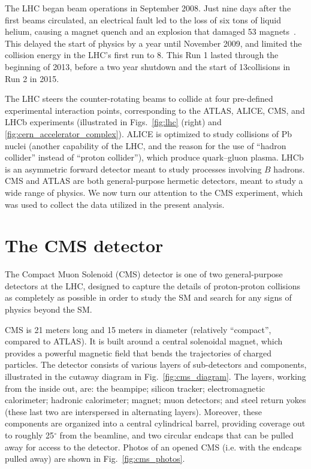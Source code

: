 The LHC began beam operations in September 2008. Just nine days after the
first beams circulated, an electrical fault led to the loss of
six tons of liquid helium, causing a magnet quench and an explosion
that damaged 53 magnets~\cite{LHC_incident}. This delayed the start of physics by a year until
November 2009, and limited the collision energy in the LHC's first run to 8\TeV.
This Run 1 lasted through the beginning of 2013, before a two year shutdown
and the start of 13\TeV collisions in Run 2 in 2015.

The LHC steers the counter-rotating beams to collide at four pre-defined
experimental interaction points, corresponding to the ATLAS, ALICE,
CMS, and LHCb experiments (illustrated in Figs.~\ref{fig:lhc} (right)
and \ref{fig:cern_accelerator_complex}).
ALICE is optimized to study collisions of Pb nuclei
(another capability of the LHC, and the reason for the use of 
``hadron collider'' instead of ``proton collider''), which
produce quark--gluon plasma. LHCb is an asymmetric forward
detector meant to study processes involving $B$ hadrons.
CMS and ATLAS are both general-purpose hermetic detectors,
meant to study a wide range of physics. 
We now turn our attention to the CMS experiment, which was used
to collect the data utilized in the present analysis.


\section{The CMS detector}
\label{sec:cms_det}

The Compact Muon Solenoid (CMS) detector is one of two general-purpose detectors
at the LHC, designed to capture the details of proton-proton collisions
as completely as possible in order to study the SM and search for any signs
of physics beyond the SM.

CMS is 21 meters long and 15 meters in diameter (relatively ``compact'', compared
to ATLAS). It is built around a central solenoidal magnet, which
provides a powerful magnetic field that bends the trajectories of charged
particles. The detector consists of various layers of sub-detectors and components,
illustrated in the cutaway diagram in Fig.~\ref{fig:cms_diagram}. The layers,
working from the inside out, are: the beampipe; silicon tracker;
electromagnetic calorimeter; hadronic calorimeter; magnet; muon detectors;
and steel return yokes (these last two are interspersed in alternating layers).
Moreover, these components are organized into a central cylindrical barrel,
providing coverage out to roughly 25$^\circ$ from the beamline,
and two circular endcaps that can be pulled away for access to the detector.
Photos of an opened CMS (i.e. with the endcaps pulled away) are shown in 
Fig.~\ref{fig:cms_photos}.

